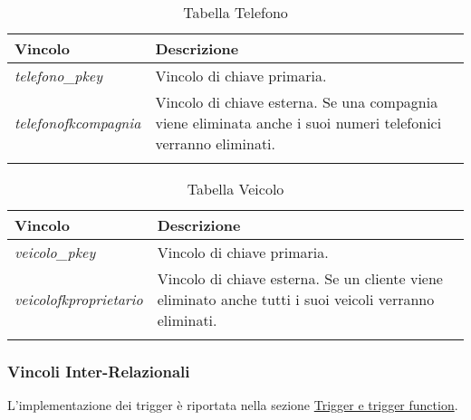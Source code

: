 \begin{longtable}{|| m{} | m{} ||}
    \hline\hline
     \textbf{Vincolo} & \textbf{Descrizione} \\ [1ex]
     \hline\hline
     \endfirsthead

      \textit{telefono\_pkey} & Vincolo di chiave primaria. \\ [1ex]
      \hline

      \textit{telefonofkcompagnia} & Vincolo di chiave esterna. Se una compagnia viene eliminata anche i suoi numeri telefonici verranno eliminati.\\ [1ex]      
     \hline\hline

     \caption*{Tabella Telefono} \\
\end{longtable}

\begin{longtable}{|| m{} | m{} ||}
    \hline\hline
     \textbf{Vincolo} & \textbf{Descrizione} \\ [1ex]
     \hline\hline
     \endfirsthead

      \textit{veicolo\_pkey} & Vincolo di chiave primaria. \\ [1ex]
      \hline

      \textit{veicolofkproprietario} & Vincolo di chiave esterna. Se un cliente viene eliminato anche tutti i suoi veicoli verranno eliminati.\\ [1ex]      
     \hline\hline

     \caption*{Tabella Veicolo} \\
\end{longtable}

\subsubsection{Vincoli Inter-Relazionali}
\label{sec:VincoliInterRelazionali}

L'implementazione dei trigger è riportata nella sezione \hyperref[sec:ImplementazioneTrigger]{Trigger e trigger function}.

